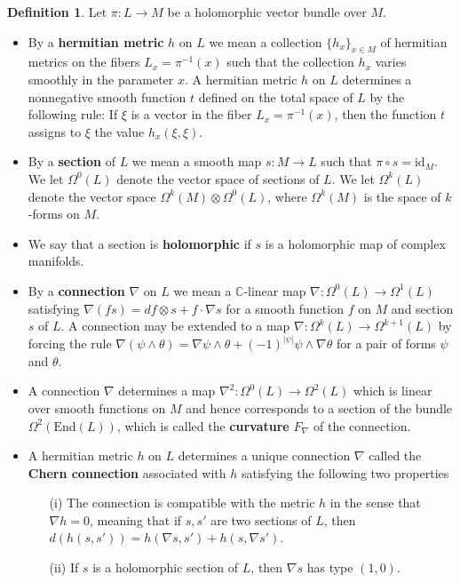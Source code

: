 \documentclass{article}
\numberwithin{equation}{section}
\theoremstyle{definition}
\newtheorem{definition}{Definition}[section]
\theoremstyle{theorem}
\begin{document}
\begin{definition}
Let $\pi : L \to M$ be a holomorphic vector bundle over $M$. 
\begin{itemize}
\item By a \textbf{hermitian metric} $h$ on $L$ we mean a collection $\{h_x\}_{x \in M}$ of hermitian metrics on the fibers $L_x = \pi^{-1}(x)$ such that the collection $h_x$ varies smoothly in the parameter $x$. A hermitian metric $h$ on $L$ determines a nonnegative smooth function $t$ defined on the total space of $L$ by the following rule: If $\xi$ is a vector in the fiber $L_x = \pi^{-1}(x)$, then the function $t$ assigns to $\xi$ the value $h_x(\xi, \xi)$. 
\item By a \textbf{section} of $L$ we mean a smooth map $s : M \to L$ such that $\pi \circ s = \text{id}_M$. We let $\Omega^0(L)$ denote the vector space of sections of $L$. We let $\Omega^k(L)$ denote the vector space $\Omega^k(M) \otimes \Omega^0(L) $, where $\Omega^k(M)$ is the space of $k$-forms on $M$. 
\item We say that a section is \textbf{holomorphic} if $s$ is a holomorphic map of complex manifolds. 
\item By a \textbf{connection} $\nabla$ on $L$ we mean a $\mathbb{C}$-linear map $\nabla : \Omega^0(L) \to \Omega^1(L)$ satisfying $\nabla (fs) = df \otimes s + f \cdot \nabla s$ for a smooth function $f$ on $M$ and section $s$ of $L$. A connection may be extended to a map $\nabla : \Omega^k(L) \to \Omega^{k+1}(L)$ by forcing the rule $\nabla(\psi \wedge \theta) = \nabla \psi \wedge \theta + (-1)^{|\psi|} \psi \wedge \nabla \theta$ for a pair of forms $\psi$ and $\theta$. 
\item A connection $\nabla$ determines a map $\nabla^2 : \Omega^0(L) \to \Omega^2(L)$ which is linear over smooth functions on $M$ and hence corresponds to a section of the bundle $\Omega^2(\text{End}(L))$, which is called the \textbf{curvature} $F_\nabla$ of the connection. 
\item A hermitian metric $h$ on $L$ determines a unique connection $\nabla$ called the \textbf{Chern connection} associated with $h$ satisfying the following two properties
\begin{enumerate}
\item[(i)] The connection is compatible with the metric $h$ in the sense that $\nabla h = 0$, meaning that if $s,s'$ are two sections of $L$, then $d(h(s,s')) = h(\nabla s, s') + h(s, \nabla s')$. 
\item[(ii)] If $s$ is a holomorphic section of $L$, then $\nabla s$ has type $(1,0)$. 

\end{enumerate}
\end{itemize}
\end{definition}
\end{document}
